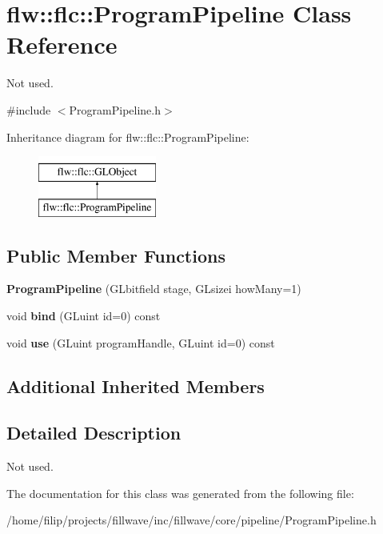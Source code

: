 \hypertarget{classflw_1_1flc_1_1ProgramPipeline}{}\section{flw\+:\+:flc\+:\+:Program\+Pipeline Class Reference}
\label{classflw_1_1flc_1_1ProgramPipeline}


Not used.  




{\ttfamily \#include $<$Program\+Pipeline.\+h$>$}

Inheritance diagram for flw\+:\+:flc\+:\+:Program\+Pipeline\+:\begin{figure}[H]
\begin{center}
\leavevmode
\includegraphics[height=2.000000cm]{classflw_1_1flc_1_1ProgramPipeline}
\end{center}
\end{figure}
\subsection*{Public Member Functions}
\begin{DoxyCompactItemize}
\item 
\mbox{\label{classflw_1_1flc_1_1ProgramPipeline_a27cccfde840ea71e39faefa82f117341}} 
{\bfseries Program\+Pipeline} (G\+Lbitfield stage, G\+Lsizei how\+Many=1)
\item 
\mbox{\label{classflw_1_1flc_1_1ProgramPipeline_a7fe69a975c766d6b0144ee1ce5d4beb8}} 
void {\bfseries bind} (G\+Luint id=0) const
\item 
\mbox{\label{classflw_1_1flc_1_1ProgramPipeline_ad2da75adc228235d00145428bb7fa987}} 
void {\bfseries use} (G\+Luint program\+Handle, G\+Luint id=0) const
\end{DoxyCompactItemize}
\subsection*{Additional Inherited Members}


\subsection{Detailed Description}
Not used. 

The documentation for this class was generated from the following file\+:\begin{DoxyCompactItemize}
\item 
/home/filip/projects/fillwave/inc/fillwave/core/pipeline/Program\+Pipeline.\+h\end{DoxyCompactItemize}

